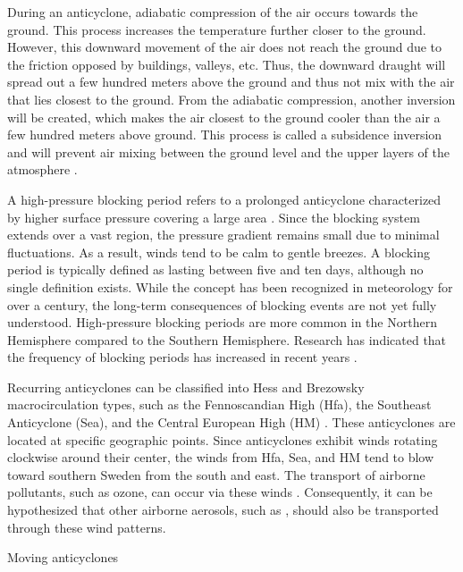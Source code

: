During an anticyclone, adiabatic compression of the air occurs towards the ground. This process increases the temperature further closer to the ground. However, this downward movement of the air does not reach the ground due to the friction opposed by buildings, valleys, etc. Thus, the downward draught will spread out a few hundred meters above the ground and thus not mix with the air that lies closest to the ground. From the adiabatic compression, another inversion will be created, which makes the air closest to the ground cooler than the air a few hundred meters above ground. This process is called a subsidence inversion and will prevent air mixing between the ground level and the upper layers of the atmosphere \cite{gramschInfluenceSurfaceSubsidence2014}.

A high-pressure blocking period refers to a prolonged anticyclone characterized by higher surface pressure covering a large area \cite{lupoAtmosphericBlockingEvents2020}. Since the blocking system extends over a vast region, the pressure gradient remains small due to minimal fluctuations. As a result, winds tend to be calm to gentle breezes. A blocking period is typically defined as lasting between five and ten days, although no single definition exists. While the concept has been recognized in meteorology for over a century, the long-term consequences of blocking events are not yet fully understood. High-pressure blocking periods are more common in the Northern Hemisphere compared to the Southern Hemisphere. Research has indicated that the frequency of blocking periods has increased in recent years \cite{lupoAtmosphericBlockingEvents2020}. 

Recurring anticyclones can be classified into Hess and Brezowsky macrocirculation types, such as the Fennoscandian High (Hfa), the Southeast Anticyclone (Sea), and the Central European High (HM) \cite{bartholyEuropeanCycloneTrack2006}. These anticyclones are located at specific geographic points. Since anticyclones exhibit winds rotating clockwise around their center, the winds from Hfa, Sea, and HM tend to blow toward southern Sweden from the south and east. The transport of airborne pollutants, such as ozone, can occur via these winds \cite{oteroImpactAtmosphericBlocking2022}. Consequently, it can be hypothesized that other airborne aerosols, such as \PM, should also be transported through these wind patterns.

Moving anticyclones

